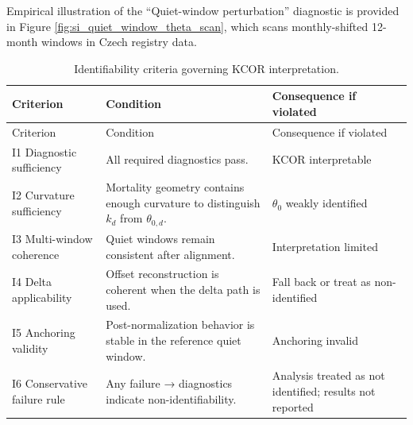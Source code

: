 \documentclass[
]{article}
\begin{document}
Empirical illustration of the ``Quiet-window perturbation'' diagnostic
is provided in Figure \ref{fig:si_quiet_window_theta_scan}, which scans
monthly-shifted 12-month windows in Czech registry data.

\begin{longtable}[]{@{}
  >{\raggedright\arraybackslash}p{}
  >{\raggedright\arraybackslash}p{}
  >{\raggedright\arraybackslash}p{}@{}}
\caption{Identifiability criteria governing KCOR
interpretation.}\label{tbl:si_identifiability}\tabularnewline
\toprule\noalign{}
\begin{minipage}[b]{\linewidth}\raggedright
Criterion
\end{minipage} & \begin{minipage}[b]{\linewidth}\raggedright
Condition
\end{minipage} & \begin{minipage}[b]{\linewidth}\raggedright
Consequence if violated
\end{minipage} \\
\midrule\noalign{}
\endfirsthead
\toprule\noalign{}
\begin{minipage}[b]{\linewidth}\raggedright
Criterion
\end{minipage} & \begin{minipage}[b]{\linewidth}\raggedright
Condition
\end{minipage} & \begin{minipage}[b]{\linewidth}\raggedright
Consequence if violated
\end{minipage} \\
\midrule\noalign{}
\endhead
\bottomrule\noalign{}
\endlastfoot
I1 Diagnostic sufficiency & All required diagnostics pass. & KCOR
interpretable \\
I2 Curvature sufficiency & Mortality geometry contains enough curvature
to distinguish \(k_d\) from \(\theta_{0,d}\). & \(\theta_0\) weakly
identified \\
I3 Multi-window coherence & Quiet windows remain consistent after
alignment. & Interpretation limited \\
I4 Delta applicability & Offset reconstruction is coherent when the
delta path is used. & Fall back or treat as non-identified \\
I5 Anchoring validity & Post-normalization behavior is stable in the
reference quiet window. & Anchoring invalid \\
I6 Conservative failure rule & Any failure → diagnostics indicate
non-identifiability. & Analysis treated as not identified; results not
reported \\
\end{longtable}
\end{document}
